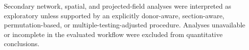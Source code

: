 Secondary network, spatial, and projected-field analyses were interpreted as exploratory unless supported by an explicitly donor-aware, section-aware, permutation-based, or multiple-testing-adjusted procedure. Analyses unavailable
or incomplete in the evaluated workflow were excluded from quantitative
conclusions.


%
